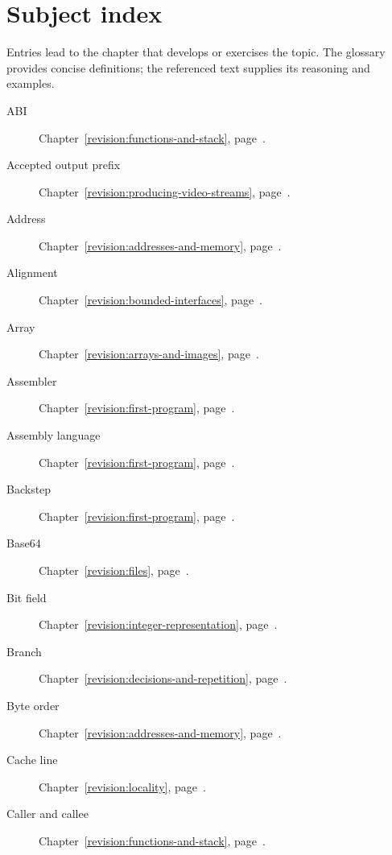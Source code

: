 \chapter*{Subject index}
\label{revision:subject-index}

Entries lead to the chapter that develops or exercises the topic. The glossary
provides concise definitions; the referenced text supplies its reasoning and examples.

\begin{description}
  \item[ABI] Chapter~\ref{revision:functions-and-stack}, page~\pageref{revision:functions-and-stack}.
  \item[Accepted output prefix] Chapter~\ref{revision:producing-video-streams}, page~\pageref{revision:producing-video-streams}.
  \item[Address] Chapter~\ref{revision:addresses-and-memory}, page~\pageref{revision:addresses-and-memory}.
  \item[Alignment] Chapter~\ref{revision:bounded-interfaces}, page~\pageref{revision:bounded-interfaces}.
  \item[Array] Chapter~\ref{revision:arrays-and-images}, page~\pageref{revision:arrays-and-images}.
  \item[Assembler] Chapter~\ref{revision:first-program}, page~\pageref{revision:first-program}.
  \item[Assembly language] Chapter~\ref{revision:first-program}, page~\pageref{revision:first-program}.
  \item[Backstep] Chapter~\ref{revision:first-program}, page~\pageref{revision:first-program}.
  \item[Base64] Chapter~\ref{revision:files}, page~\pageref{revision:files}.
  \item[Bit field] Chapter~\ref{revision:integer-representation}, page~\pageref{revision:integer-representation}.
  \item[Branch] Chapter~\ref{revision:decisions-and-repetition}, page~\pageref{revision:decisions-and-repetition}.
  \item[Byte order] Chapter~\ref{revision:addresses-and-memory}, page~\pageref{revision:addresses-and-memory}.
  \item[Cache line] Chapter~\ref{revision:locality}, page~\pageref{revision:locality}.
  \item[Caller and callee] Chapter~\ref{revision:functions-and-stack}, page~\pageref{revision:functions-and-stack}.

\end{description}
